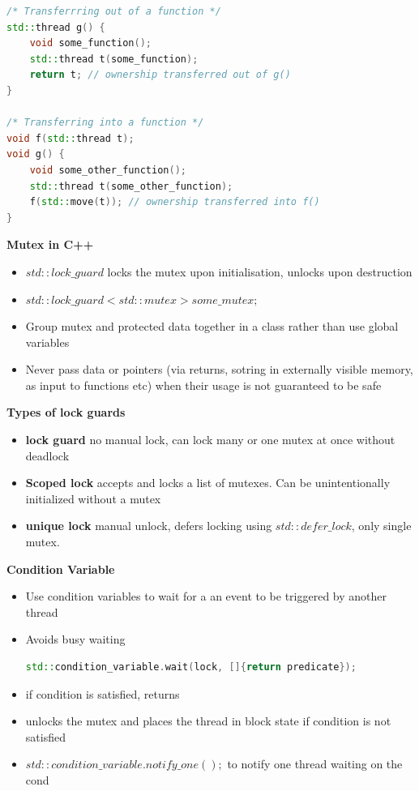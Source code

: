 \documentclass[10pt, landscape]{article}
\begin{document}
\begin{multicols}{4}
\begin{itemize}
\begin{itemize}
\begin{lstlisting}[language=C++, breaklines=true, breakatwhitespace=true]
/* Transferrring out of a function */
std::thread g() {
    void some_function();
    std::thread t(some_function);
    return t; // ownership transferred out of g()
}

/* Transferring into a function */
void f(std::thread t);
void g() {
    void some_other_function();
    std::thread t(some_other_function);
    f(std::move(t)); // ownership transferred into f()
}
    \end{lstlisting}
\end{itemize}


\textbf{Mutex in C++} \\
\begin{itemize}
    \item $std::lock\_guard$ locks the mutex upon initialisation, unlocks upon destruction
    \item $std::lock\_guard<std::mutex>{some\_mutex};$ 
    \item Group mutex and protected data together in a class rather than use global variables
    \item Never pass data or pointers (via returns, sotring in externally visible memory, as input to functions etc) when their usage is not guaranteed to be safe
\end{itemize}


\textbf{Types of lock guards}
\begin{itemize}
    \item \textbf{lock guard} no manual lock, can lock many or one mutex at once without deadlock
    \item \textbf{Scoped lock} accepts and locks a list of mutexes. Can be unintentionally initialized without a mutex
    \item \textbf{unique lock} manual unlock, defers locking using $std::defer\_lock$, only single mutex. 
\end{itemize}

\textbf{Condition Variable} \\
\begin{itemize}
    \item Use condition variables to wait for a an event to be triggered by another thread
    \item Avoids busy waiting 
    \begin{lstlisting}[language=C++, breaklines=true, breakatwhitespace=true]
std::condition_variable.wait(lock, []{return predicate});
    \end{lstlisting}
    \item if condition is satisfied, returns
    \item unlocks the mutex and places the thread in block state if condition is not satisfied
    \item $std::condition\_variable.notify\_one();$ to notify one thread waiting on the cond
\end{itemize}



\end{itemize}
\end{multicols}
\end{document}
